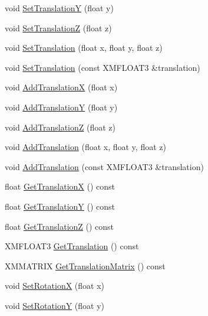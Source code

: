 \begin{DoxyCompactItemize}
\item 
void \hyperlink{structmage_1_1_transform_ab2c63fbbe2dd2c40d841f8c37df24394}{Set\+TranslationY} (float y)
\item 
void \hyperlink{structmage_1_1_transform_aba982207d2d2d20cae2ba9d8496e8531}{Set\+TranslationZ} (float z)
\item 
void \hyperlink{structmage_1_1_transform_acf702bb57431be2986ca487e07189bda}{Set\+Translation} (float x, float y, float z)
\item 
void \hyperlink{structmage_1_1_transform_ad82e98f98d57cd3e9878336b6c3e804c}{Set\+Translation} (const X\+M\+F\+L\+O\+A\+T3 \&translation)
\item 
void \hyperlink{structmage_1_1_transform_aa4b8469fa07ab4ad3b50aaa34389967f}{Add\+TranslationX} (float x)
\item 
void \hyperlink{structmage_1_1_transform_aef8f3728f6d6d55e69689cff2af4c26f}{Add\+TranslationY} (float y)
\item 
void \hyperlink{structmage_1_1_transform_a0553f72a6fcf38128d2201d54584f079}{Add\+TranslationZ} (float z)
\item 
void \hyperlink{structmage_1_1_transform_a2e981e670eea4d731bda4ee68f0b7fae}{Add\+Translation} (float x, float y, float z)
\item 
void \hyperlink{structmage_1_1_transform_a1125e444c9537e09a328f37a47e61b58}{Add\+Translation} (const X\+M\+F\+L\+O\+A\+T3 \&translation)
\item 
float \hyperlink{structmage_1_1_transform_a171525f6ba157e319646548f2c459395}{Get\+TranslationX} () const
\item 
float \hyperlink{structmage_1_1_transform_a7feba3c1d24a986e440dd6571edc14b2}{Get\+TranslationY} () const
\item 
float \hyperlink{structmage_1_1_transform_a023ce9ea6afaaa80776b4d43957964bf}{Get\+TranslationZ} () const
\item 
X\+M\+F\+L\+O\+A\+T3 \hyperlink{structmage_1_1_transform_aca74308060f244adf137676e79a9f6e5}{Get\+Translation} () const
\item 
X\+M\+M\+A\+T\+R\+IX \hyperlink{structmage_1_1_transform_a4f246a50de8bdfd1bd9dd8e07b7a8c01}{Get\+Translation\+Matrix} () const
\item 
void \hyperlink{structmage_1_1_transform_ae526dabb395eea9481fc072624f6bec4}{Set\+RotationX} (float x)
\item 
void \hyperlink{structmage_1_1_transform_a95c83ba282bf84aeb1c49d9ba8242609}{Set\+RotationY} (float y)
\item 

\end{DoxyCompactItemize}
